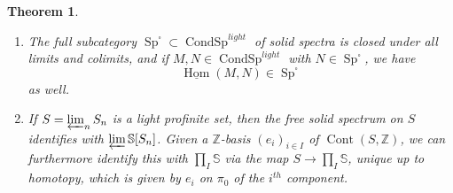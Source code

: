 \documentclass[12pt]{article}
\newtheorem{theorem}{Theorem}[section]
\newcommand{\on}{\operatorname}
\begin{document}
\begin{theorem}\label{solidproperties}
\begin{enumerate}
\item The full subcategory $\on{Sp}^\square\subset \on{CondSp}^{light}$ of solid spectra is closed under all limits and colimits, and if $M,N\in\on{CondSp}^{light}$ with $N\in \on{Sp}^\square$, we have
$$\underline{\on{Hom}}(M,N) \in \on{Sp}^\square$$
as well.
\item If $S=\varprojlim_n S_n$ is a light profinite set, then the free solid spectrum on $S$ identifies with $\varprojlim \mathbb{S}[S_n]$.  Given a $\mathbb{Z}$-basis $(e_i)_{i\in I}$ of $\on{Cont}(S,\mathbb{Z})$, we can furthermore identify this with $\prod_I\mathbb{S}$ via the map $S\to \prod_I \mathbb{S}$, unique up to homotopy, which is given by $e_i$ on $\pi_0$ of the $i^{th}$ component.
\end{enumerate}
\end{theorem}
\end{document}
